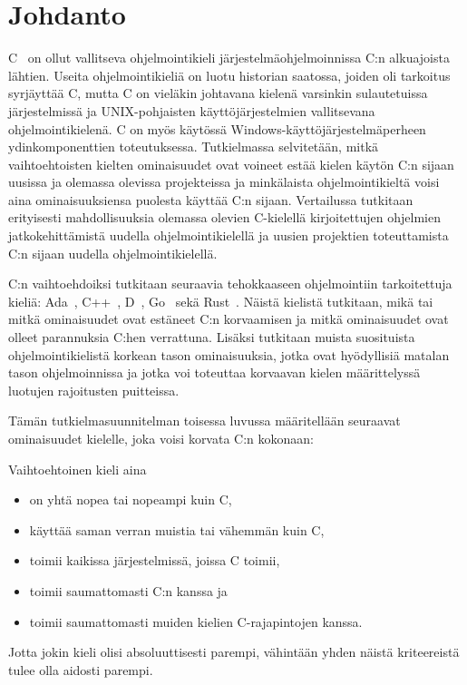 \section{Johdanto} 

C~\citep{C18} on ollut vallitseva ohjelmointikieli järjestelmäohjelmoinnissa
C:n alkuajoista lähtien. Useita ohjelmointikieliä on luotu historian saatossa,
joiden oli tarkoitus syrjäyttää C, mutta C on vieläkin johtavana kielenä
varsinkin sulautetuissa järjestelmissä ja UNIX-pohjaisten käyttöjärjestelmien
vallitsevana ohjelmointikielenä. C on myös käytössä
Windows-käyttöjärjestelmäperheen ydinkomponenttien toteutuksessa.
Tutkielmassa selvitetään, mitkä vaihtoehtoisten kielten ominaisuudet ovat
voineet estää kielen käytön C:n sijaan uusissa ja olemassa olevissa projekteissa
ja minkälaista ohjelmointikieltä voisi aina ominaisuuksiensa puolesta käyttää
C:n sijaan. Vertailussa tutkitaan erityisesti mahdollisuuksia olemassa olevien
C-kielellä kirjoitettujen ohjelmien jatkokehittämistä uudella
ohjelmointikielellä ja uusien projektien toteuttamista C:n sijaan uudella
ohjelmointikielellä.

C:n vaihtoehdoiksi tutkitaan seuraavia tehokkaaseen ohjelmointiin tarkoitettuja
kieliä: Ada~\citep{ADA12}, C++~\citep{CPP17}, D~\citep{D}, Go~\citep{golang}
sekä Rust~\citep{rust}. Näistä kielistä tutkitaan, mikä tai mitkä ominaisuudet
ovat estäneet C:n korvaamisen ja mitkä ominaisuudet ovat olleet parannuksia
C:hen verrattuna. Lisäksi tutkitaan muista suosituista ohjelmointikielistä
korkean tason ominaisuuksia, jotka ovat hyödyllisiä matalan tason
ohjelmoinnissa ja jotka voi toteuttaa korvaavan kielen määrittelyssä luotujen
rajoitusten puitteissa.


Tämän tutkielmasuunnitelman toisessa luvussa määritellään seuraavat
ominaisuudet kielelle, joka voisi korvata C:n kokonaan:

Vaihtoehtoinen kieli aina
\begin{itemize}[topsep=0pt,itemsep=0pt]
    \item on yhtä nopea tai nopeampi kuin C,
    \item käyttää saman verran muistia tai vähemmän kuin C,
    \item toimii kaikissa järjestelmissä, joissa C toimii,
    \item toimii saumattomasti C:n kanssa ja
    \item toimii saumattomasti muiden kielien C-rajapintojen kanssa.
\end{itemize}
Jotta jokin kieli olisi absoluuttisesti parempi, vähintään yhden näistä
kriteereistä tulee olla aidosti parempi.

